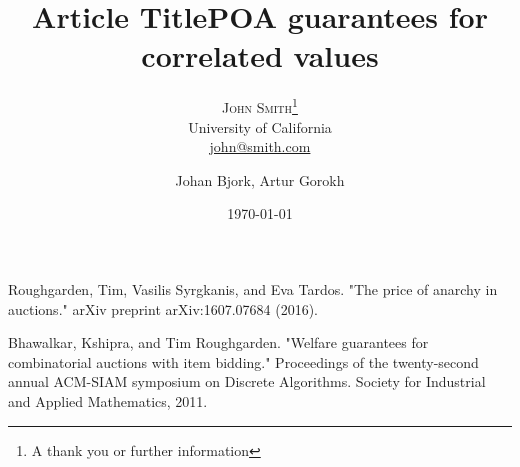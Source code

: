 \documentclass[twoside,onecolumn]{article}
\title{Article Title} %
\author{%
\textsc{John Smith}\thanks{A thank you or further information} \\[1ex] %
\normalsize University of California \\ %
\normalsize \href{mailto:john@smith.com}{john@smith.com} %
}
\date{\today} %
\author{Johan Bjork, Artur Gorokh}
\begin{document}
\title{POA guarantees for correlated values
}
\maketitle









%
%
\begin{thebibliography}{9}
Roughgarden, Tim, Vasilis Syrgkanis, and Eva Tardos. "The price of anarchy in auctions." arXiv preprint arXiv:1607.07684 (2016).
 
 Bhawalkar, Kshipra, and Tim Roughgarden. "Welfare guarantees for combinatorial auctions with item bidding." Proceedings of the twenty-second annual ACM-SIAM symposium on Discrete Algorithms. Society for Industrial and Applied Mathematics, 2011.
 
\end{thebibliography}
\end{document}
